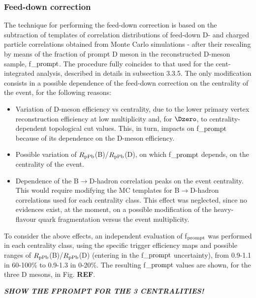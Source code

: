 \subsubsection{Feed-down correction}
The technique for performing the feed-down correction is based on the subtraction of templates of correlation distributions of feed-down D- and charged particle correlations obtained from Monte Carlo simulations - after their rescaling by means of the fraction of prompt D meson in the reconstructed D-meson sample, f$\_{\rm prompt}$.
The procedure fully coincides to that used for the cent-integrated analysis, described in details in subsection 3.3.5.
The only modification consists in a possible dependence of the feed-down correction on the centrality of the event, for the following reasons:
\begin{itemize}
  \item Variation of D-meson efficiency vs centrality, due to the lower primary vertex reconstruction efficiency at low multiplicity and, for $\Dzero$, to centrality-dependent topological cut values. This, in turn, impacts on f$\_{\rm prompt}$ because of its dependence on the D-meson efficiency.
  \item Possible variation of $R_{\rm pPb}$(B)/$R_{\rm pPb}$(D), on which f$\_{\rm prompt}$ depends, on the centrality of the event.
  \item Dependence of the B$\rightarrow$D-hadron correlation peaks on the event centrality. This would require modifying the MC templates for B$\rightarrow$D-hadron correlations used for each centrality class. This effect was neglected, since no evidences exist, at the moment, on a possible modification of the heavy-flavour quark fragmentation versus the event multiplicity.
\end{itemize}
To consider the above effects, an independent evaluation of f$_{\rm prompt}$ was performed in each centrality class, using the specific trigger efficiency maps and possible ranges of $R_{\rm pPb}$(B)/$R_{\rm pPb}$(D) (entering in the f$\_{\rm prompt}$ uncertainty), from 0.9-1.1 in 60-100\% to 0.9-1.3 in 0-20\%.
The resulting f$\_{\rm prompt}$ values are shown, for the three D mesons, in Fig. {\bf REF}.

\textit{\textbf{SHOW THE FPROMPT FOR THE 3 CENTRALITIES!}} 
